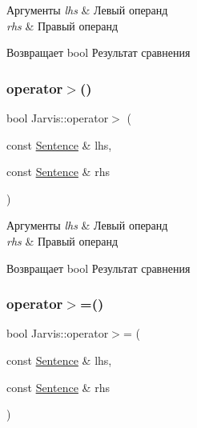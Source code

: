\begin{DoxyParams}{Аргументы}
{\em lhs} & Левый операнд \\
\hline
{\em rhs} & Правый операнд \\
\hline
\end{DoxyParams}
\begin{DoxyReturn}{Возвращает}
bool Результат сравнения 
\end{DoxyReturn}
\mbox{\label{namespaceJarvis_ae92529451bff5ef1a8e6117041b0d4eb}} 
\subsubsection{\texorpdfstring{operator$>$()}{operator>()}}
{\footnotesize\ttfamily bool Jarvis\+::operator$>$ (\begin{DoxyParamCaption}\item[{const \hyperlink{classJarvis_1_1Sentence}{Sentence} \&}]{lhs,  }\item[{const \hyperlink{classJarvis_1_1Sentence}{Sentence} \&}]{rhs }\end{DoxyParamCaption})}


\begin{DoxyParams}{Аргументы}
{\em lhs} & Левый операнд \\
\hline
{\em rhs} & Правый операнд \\
\hline
\end{DoxyParams}
\begin{DoxyReturn}{Возвращает}
bool Результат сравнения 
\end{DoxyReturn}
\mbox{\label{namespaceJarvis_a4f81241fea0f46c08819fbbce5b115ed}} 
\subsubsection{\texorpdfstring{operator$>$=()}{operator>=()}}
{\footnotesize\ttfamily bool Jarvis\+::operator$>$= (\begin{DoxyParamCaption}\item[{const \hyperlink{classJarvis_1_1Sentence}{Sentence} \&}]{lhs,  }\item[{const \hyperlink{classJarvis_1_1Sentence}{Sentence} \&}]{rhs }\end{DoxyParamCaption})}


